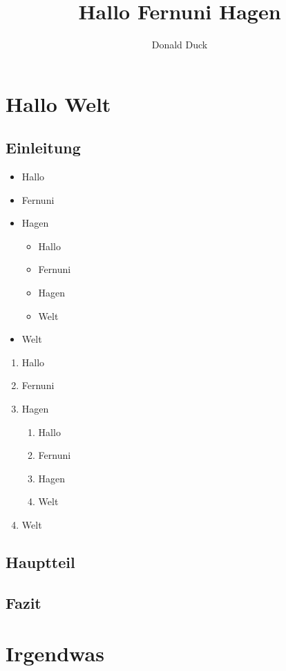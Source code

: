 \documentclass[12pt,ngerman,parskip=half]{scrreprt}
\author{Donald Duck}
\title{Hallo Fernuni Hagen}
\begin{document}
\maketitle

\tableofcontents

\chapter{Hallo Welt}

\section{Einleitung}

\blindtext[1] 

\begin{itemize}
\item Hallo
\item Fernuni
\item Hagen
\begin{itemize}
\item Hallo
\item Fernuni
\item Hagen
\item Welt
\end{itemize}
\item Welt
\end{itemize}

\begin{enumerate}
\item Hallo
\item Fernuni
\item Hagen
\begin{enumerate}
\item Hallo
\item Fernuni
\item Hagen
\item Welt
\end{enumerate}
\item Welt
\end{enumerate}

\section{Hauptteil}

\blindtext[1] 

\blindtext[1]

\section{Fazit}

\blindtext[1] 

\chapter{Irgendwas}
\end{document}
